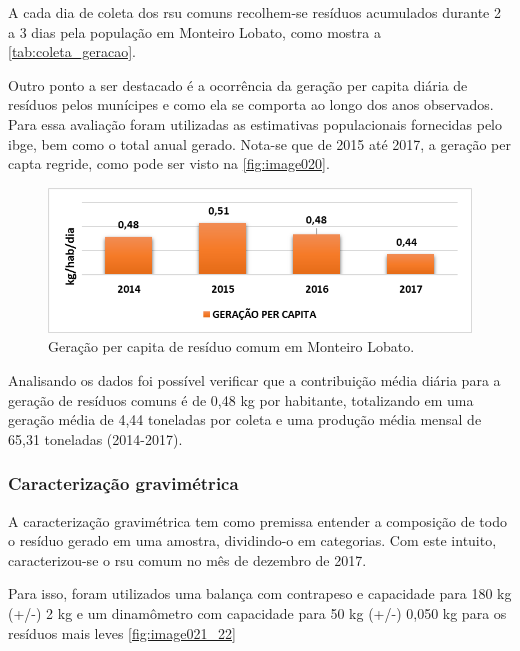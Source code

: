 	A cada dia de coleta dos \gls{rsu} comuns recolhem-se resíduos acumulados durante 2 a 3 dias pela população em Monteiro Lobato, como mostra a \autoref{tab:coleta_geracao}.
	
	

	Outro ponto a ser destacado é a ocorrência da geração per capita diária de resíduos pelos munícipes e como ela se comporta ao longo dos anos observados. Para essa avaliação foram utilizadas as estimativas populacionais fornecidas pelo \gls{ibge}, bem como o total anual gerado. Nota-se que de 2015 até 2017, a geração per capta regride, como pode ser visto na \autoref{fig:image020}.
	
\begin{figure}
	\centering
	\includegraphics[width=0.7\linewidth]{produtos/prodtres/image020}
	\caption{Geração per capita de resíduo comum em Monteiro Lobato.}
	\label{fig:image020}
\end{figure}

	
	Analisando os dados foi possível verificar que a contribuição média diária para a geração de resíduos comuns é de 0,48 kg por habitante, totalizando em uma geração média de 4,44 toneladas por coleta e uma produção média mensal de 65,31 toneladas (2014-2017).
	
	\subsubsection{Caracterização gravimétrica} 	
	\label{subsubsec:gravimetria_comum}

	A caracterização gravimétrica tem como premissa entender a composição de todo o resíduo gerado em uma amostra, dividindo-o em categorias. Com este intuito, caracterizou-se o \gls{rsu} comum no mês de dezembro de 2017.
	
	Para isso, foram utilizados uma balança com contrapeso e capacidade para 180 kg (+/-) 2 kg e um dinamômetro com capacidade para 50 kg (+/-) 0,050 kg para os resíduos mais leves \autoref{fig:image021_22}


